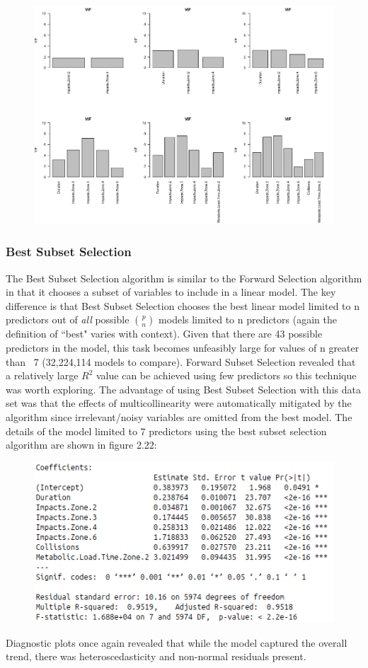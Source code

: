 \begin{figure}[h]
	\centering
	\includegraphics[width=.9\linewidth]{Images/VIFForwardSelection.png}
\end{figure}

\subsubsection{Best Subset Selection}
The Best Subset Selection algorithm is similar to the Forward Selection algorithm in that it chooses a subset of variables to include in a linear model. The key difference is that Best Subset Selection chooses the best linear model limited to n predictors out of \emph{all} possible ${p}\choose{n}$ models limited to n predictors (again the definition of ``best" varies with context). Given that there are 43 possible predictors in the model, this task becomes unfeasibly large for values of n greater than ~7 (32,224,114 models to compare). Forward Subset Selection revealed that a relatively large $R^2$ value can be achieved using few predictors so this technique was worth exploring. The advantage of using Best Subset Selection with this data set was that the effects of multicollinearity were automatically mitigated by the algorithm since irrelevant/noisy variables are omitted from the best model. The details of the model limited to 7 predictors using the best subset selection algorithm are shown in figure 2.22: 
\begin{figure}[h]
	\centering
	\includegraphics[width=.75\linewidth]{Images/BestSubsetSelectionConclusion.png}
\end{figure}
\break\hfill
Diagnostic plots once again revealed that while the model captured the overall trend, there was heteroscedasticity and non-normal residuals present. 

